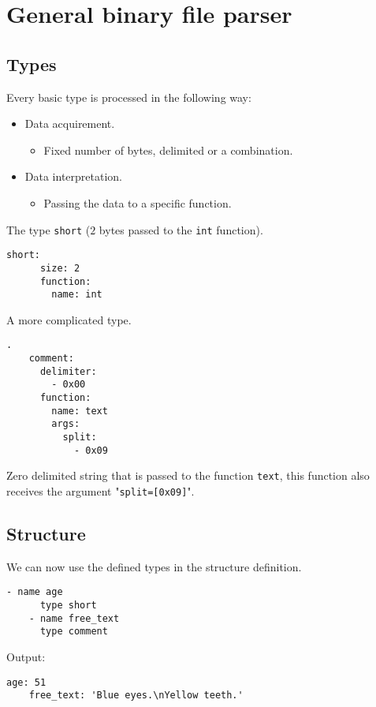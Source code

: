 \documentclass[slidestop]{beamer}
\begin{document}
\section{General binary file parser}
\subsection{Types}
\begin{pframe}
  Every basic type is processed in the following way:
  \begin{itemize}
    \item Data acquirement.
    \begin{itemize}
      \item Fixed number of bytes, delimited or a combination.
    \end{itemize}
    \item Data interpretation.
    \begin{itemize}
      \item Passing the data to a specific function.
    \end{itemize}
  \end{itemize}
  \bigskip

  The type \lstinline{short} ($2$ bytes passed to the \lstinline{int}
  function).
  \begin{lstlisting}[language=none, caption={Simple types definition.}]
    short:
      size: 2
      function:
        name: int
  \end{lstlisting}
\end{pframe}

\begin{pframe}
  A more complicated type.
  \begin{lstlisting}[language=none, caption={Less simple types definition}].
    comment:
      delimiter:
        - 0x00
      function:
        name: text
        args:
          split:
            - 0x09
  \end{lstlisting}

  Zero delimited string that is passed to the function \lstinline{text}, this
  function also receives the argument "\lstinline{split=[0x09]}".
\end{pframe}

\subsection{Structure}
\begin{pframe}
  We can now use the defined types in the structure definition.
  \begin{lstlisting}[language=none, caption={Structure snippet.}]
    - name age
      type short
    - name free_text
      type comment
  \end{lstlisting}

  Output:
  \begin{lstlisting}[language=none, caption={Output snippet.}]
    age: 51
    free_text: 'Blue eyes.\nYellow teeth.'
  \end{lstlisting}
\end{pframe}
\end{document}
